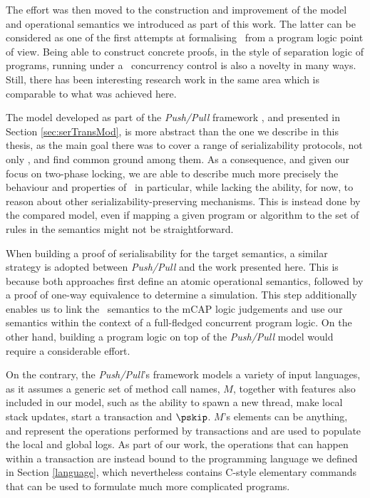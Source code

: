 	The effort was then moved to the construction and improvement of the model and operational semantics we introduced as part of this work. The latter can be considered as one of the first attempts at formalising \tpl\ from a program logic point of view. Being able to construct concrete proofs, in the style of separation logic of programs, running under a \tpl\ concurrency control is also a novelty in many ways. Still, there has been interesting research work in the same area which is comparable to what was achieved here.

	The model developed as part of the \textit{Push/Pull} framework \cite{pushPull}, and presented in Section \ref{sec:serTransMod}, is more abstract than the one we describe in this thesis, as the main goal there was to cover a range of serializability protocols, not only \tpl, and find common ground among them. As a consequence, and given our focus on two-phase locking, we are able to describe much more precisely the behaviour and properties of \tpl\ in particular, while lacking the ability, for now, to reason about other serializability-preserving mechanisms. This is instead done by the compared model, even if mapping a given program or algorithm to the set of rules in the semantics might not be straightforward.
	
	When building a proof of serialisability for the target semantics, a similar strategy is adopted between \textit{Push/Pull} and the work presented here. This is because both approaches first define an atomic operational semantics, followed by a proof of one-way equivalence to determine a simulation. This step additionally enables us to link the \tpl\ semantics to the mCAP logic judgements and use our semantics within the context of a full-fledged concurrent program logic. On the other hand, building a program logic on top of the \textit{Push/Pull} model would require a considerable effort.
	
	On the contrary, the \textit{Push/Pull}'s framework models a variety of input languages, as it assumes a generic set of method call names, $M$, together with features also included in our model, such as the ability to spawn a new thread, make local stack updates, start a transaction and $\pskip$. $M$'s elements can be anything, and represent the operations performed by transactions and are used to populate the local and global logs. As part of our work, the operations that can happen within a transaction are instead bound to the programming language we defined in Section \ref{language}, which nevertheless contains C-style elementary commands that can be used to formulate much more complicated programs.
	
